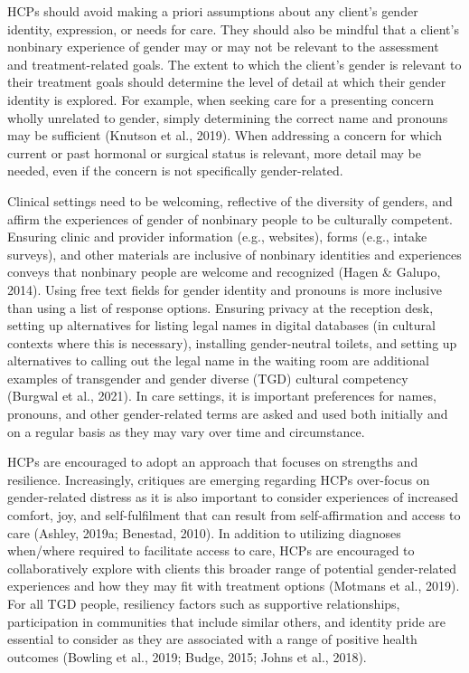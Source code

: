 \documentclass[
]{book}
\begin{document}
HCPs should avoid making a priori assumptions
about any client's gender identity, expression, or
needs for care. They should also be mindful that
a client's nonbinary experience of gender may or
may not be relevant to the assessment and
treatment-related goals. The extent to which the
client's gender is relevant to their treatment goals
should determine the level of detail at which their
gender identity is explored. For example, when
seeking care for a presenting concern wholly unrelated to gender, simply determining the correct
name and pronouns may be sufficient (Knutson
et al., 2019). When addressing a concern for which
current or past hormonal or surgical status is relevant, more detail may be needed, even if the
concern is not specifically gender-related.

Clinical settings need to be welcoming, reflective of the diversity of genders, and affirm the
experiences of gender of nonbinary people to be
culturally competent. Ensuring clinic and provider information (e.g., websites), forms (e.g.,
intake surveys), and other materials are inclusive
of nonbinary identities and experiences conveys
that nonbinary people are welcome and recognized (Hagen \& Galupo, 2014). Using free text
fields for gender identity and pronouns is more
inclusive than using a list of response options.
Ensuring privacy at the reception desk, setting
up alternatives for listing legal names in digital
databases (in cultural contexts where this is necessary), installing gender-neutral toilets, and setting up alternatives to calling out the legal name
in the waiting room are additional examples of
transgender and gender diverse (TGD) cultural
competency (Burgwal et al., 2021). In care settings, it is important preferences for names, pronouns, and other gender-related terms are asked
and used both initially and on a regular basis as
they may vary over time and circumstance.

HCPs are encouraged to adopt an approach
that focuses on strengths and resilience.
Increasingly, critiques are emerging regarding
HCPs over-focus on gender-related distress as it
is also important to consider experiences of
increased comfort, joy, and self-fulfilment that
can result from self-affirmation and access to care
(Ashley, 2019a; Benestad, 2010). In addition to
utilizing diagnoses when/where required to facilitate access to care, HCPs are encouraged to collaboratively explore with clients this broader
range of potential gender-related experiences and
how they may fit with treatment options
(Motmans et al., 2019). For all TGD people, resiliency factors such as supportive relationships,
participation in communities that include similar
others, and identity pride are essential to consider
as they are associated with a range of positive
health outcomes (Bowling et al., 2019; Budge,
2015; Johns et al., 2018).
\end{document}
